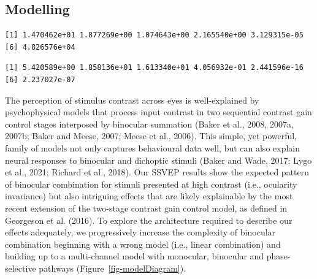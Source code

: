\documentclass[
  12pt,
]{article}
\begin{document}
\subsection{Modelling}\label{modelling}

\begin{verbatim}
[1] 1.470462e+01 1.877269e+00 1.074643e+00 2.165540e+00 3.129315e-05
[6] 4.826576e+04
\end{verbatim}

\begin{verbatim}
[1] 5.420589e+00 1.858136e+01 1.613340e+01 4.056932e-01 2.441596e-16
[6] 2.237027e-07
\end{verbatim}

The perception of stimulus contrast across eyes is well-explained by
psychophysical models that process input contrast in two sequential
contrast gain control stages interposed by binocular summation (Baker et
al., 2008, 2007a, 2007b; Baker and Meese, 2007; Meese et al., 2006).
This simple, yet powerful, family of models not only captures
behavioural data well, but can also explain neural responses to
binocular and dichoptic stimuli (Baker and Wade, 2017; Lygo et al.,
2021; Richard et al., 2018). Our SSVEP results show the expected pattern
of binocular combination for stimuli presented at high contrast (i.e.,
ocularity invariance) but also intriguing effects that are likely
explainable by the most recent extension of the two-stage contrast gain
control model, as defined in Georgeson et al. (2016). To explore the
architecture required to describe our effects adequately, we
progressively increase the complexity of binocular combination beginning
with a wrong model (i.e., linear combination) and building up to a
multi-channel model with monocular, binocular and phase-selective
pathways (Figure~\ref{fig-modelDiagram}).
\end{document}
